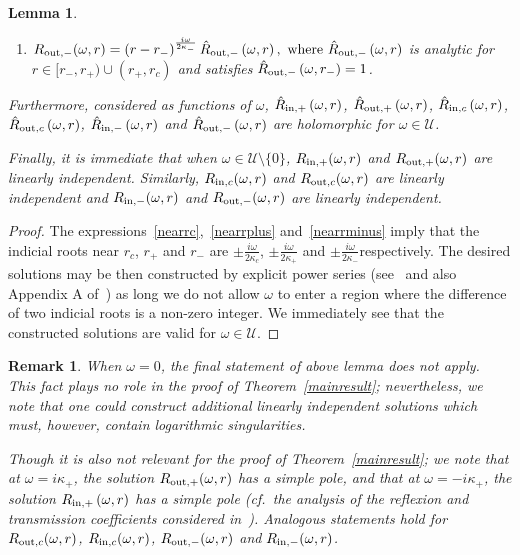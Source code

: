 \documentclass[A4,10pt]{article}
\newtheorem{lemma}{Lemma}[subsection]
\newtheorem{remark}{Remark}[section]
\begin{document}
\begin{lemma}
\begin{enumerate}
	\item $R_{{\rm out},-}(\omega,r) = \left(r-r_-\right)^{\frac{i\omega}{2\kappa_-}}\hat{R}_{{\rm out},-}\left(\omega,r\right), \text{ where }\hat{R}_{{\rm out},-}\left(\omega,r\right)$ is analytic for  $r \in [r_-,r_+) \cup (r_+,r_c)$ and satisfies $\hat{R}_{{\rm out},-}\left(\omega,r_-\right) = 1$.

\end{enumerate}

Furthermore, considered as functions of $\omega$, $\hat{R}_{{\rm in},+}\left(\omega,r\right)$, $\hat{R}_{{\rm out},+}\left(\omega,r\right)$, $\hat{R}_{{\rm in},c}\left(\omega,r\right)$, $\hat{R}_{{\rm out},c}\left(\omega,r\right)$,  $\hat{R}_{{\rm in},-}\left(\omega,r\right)$ and $\hat{R}_{{\rm out},-}\left(\omega,r\right)$ are holomorphic for $\omega \in \mathcal{U}$.

Finally, it is immediate that when $\omega \in \mathcal{U}\setminus\{0\}$, $R_{{\rm in},+}(\omega,r)$ and $R_{{\rm out},+}(\omega,r)$ are linearly independent. Similarly, $R_{{\rm in},c}(\omega,r)$ and $R_{{\rm out},c}(\omega,r)$ are linearly independent and $R_{{\rm in},-}(\omega,r)$ and $R_{{\rm out},-}(\omega,r)$ are linearly independent. 

\end{lemma}
\begin{proof}The expressions~\eqref{nearrc},~\eqref{nearrplus} and~\eqref{nearrminus} imply that the indicial roots near $r_c$, $r_+$ and $r_-$ are $\pm\frac{i\omega}{2\kappa_c}$, $\pm\frac{i\omega}{2\kappa_+}$ and $\pm\frac{i\omega}{2\kappa_-}$respectively. The desired solutions may be then constructed by explicit power series (see~\cite{olver} and also Appendix A of~\cite{yakovinsta}) as long we do not allow $\omega$ to enter a region where the difference of two indicial roots is a non-zero integer. We immediately see that the constructed solutions are valid for $\omega \in \mathcal{U}$.
\end{proof}
\begin{remark}When $\omega = 0$, the final statement of above lemma does not apply. This fact plays no role in the proof of Theorem~\ref{mainresult}; nevertheless, we note that one could construct additional linearly independent solutions which must, however, contain logarithmic singularities. 

Though it is also not relevant for the proof of Theorem~\ref{mainresult}; we note that at $\omega = i\kappa_+$, the solution $R_{{\rm out},+}(\omega,r)$ has a simple pole, and that at $\omega = -i\kappa_+$, the solution $R_{{\rm in},+}\left(\omega,r\right)$ has a simple pole (cf.~the analysis of the reflexion and transmission coefficients considered in~\cite{CH}). Analogous statements hold for $R_{{\rm out},c}(\omega,r)$, $R_{{\rm in},c}(\omega,r)$,  $R_{{\rm out},-}(\omega,r)$ and $R_{{\rm in},-}(\omega,r)$.
\end{remark}
\end{document}
